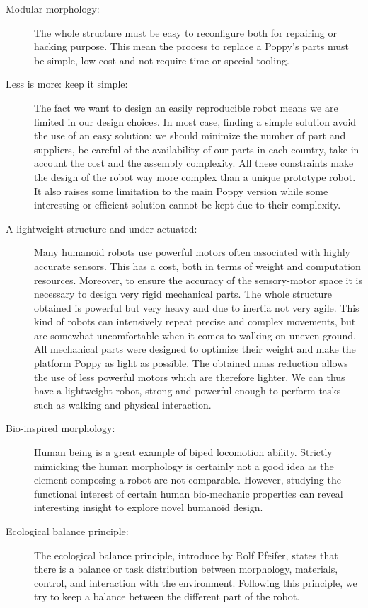 \begin{description}

    \item[Modular morphology:] The whole structure must be easy to reconfigure both for repairing or hacking purpose. This mean the process to replace a Poppy's parts must be simple, low-cost and not require time or special tooling.

    \item[Less is more: keep it simple:] The fact we want to design an easily reproducible robot means we are limited in our design choices. In most case, finding a simple solution avoid the use of an easy solution: we should minimize the number of part and suppliers, be careful of the availability of our parts in each country, take in account the cost and the assembly complexity. All these constraints make the design of the robot way more complex than a unique prototype robot. It also raises some limitation to the main Poppy version while some interesting or efficient solution cannot be kept due to their complexity.

    \item[A lightweight structure and under-actuated:] Many humanoid robots use powerful motors often associated with highly accurate sensors. This has a cost, both in terms of weight and computation resources. Moreover, to ensure the accuracy of the sensory-motor space it is necessary to design very rigid mechanical parts. The whole structure obtained is powerful but very heavy and due to inertia not very agile. This kind of robots can intensively repeat precise and complex movements, but are somewhat uncomfortable when it comes to walking on uneven ground. All mechanical parts were designed to optimize their weight and make the platform Poppy as light as possible. The obtained mass reduction allows the use of less powerful motors which are therefore lighter. We can thus have a lightweight robot, strong and powerful enough to perform tasks such as walking and physical interaction.

    \item[Bio-inspired morphology:] Human being is a great example of biped locomotion ability. Strictly mimicking the human morphology is certainly not a good idea as the element composing a robot are not comparable. However, studying the functional interest of certain human bio-mechanic properties can reveal interesting insight to explore novel humanoid design.
    \item[Ecological balance principle:] The ecological balance principle, introduce by Rolf Pfeifer, states that there is a balance or task distribution between morphology, materials, control, and interaction with the environment. Following this principle, we try to keep a balance between the different part of the robot.


\end{description}
